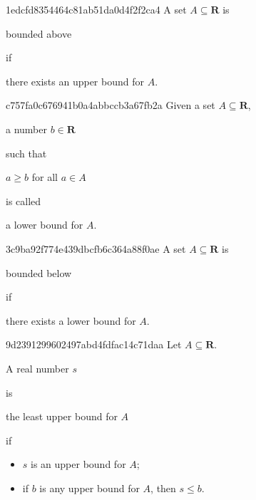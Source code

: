 \begin{note}{1edcfd8354464c81ab51da0d4f2f2ca4}
    A set \({ A \subseteq \mathbf{R} }\) is \begin{icloze}{2}bounded above\end{icloze} if \begin{icloze}{1}there exists an upper bound for \({ A }\).\end{icloze}
\end{note}

\begin{note}{c757fa0c676941b0a4abbccb3a67fb2a}
    Given a set \({ A \subseteq \mathbf{R} }\), \begin{icloze}{3}a number \({ b \in \mathbf{R} }\)\end{icloze} such that \begin{icloze}{2}\({ a \geq b }\) for all \({ a \in A }\)\end{icloze} is called \begin{icloze}{1}a lower bound for \({ A }\).\end{icloze}
\end{note}

\begin{note}{3c9ba92f774e439dbcfb6c364a88f0ae}
    A set \({ A \subseteq \mathbf{R} }\) is \begin{icloze}{2}bounded below\end{icloze} if \begin{icloze}{1}there exists a lower bound for \({ A }\).\end{icloze}
\end{note}

\begin{note}{9d2391299602497abd4fdfac14c71daa}
    Let \({ A \subseteq \mathbf{R} }\). \begin{icloze}{4}A real number \({ s }\)\end{icloze} is \begin{icloze}{3}the least upper bound for \({ A }\)\end{icloze} if
    \begin{itemize}
        \item{} \begin{icloze}{2}\({ s }\) is an upper bound for \({ A }\);\end{icloze}
        \item{} \begin{icloze}{1}if \({ b }\) is any upper bound for \({ A }\), then \({ s \leq b }\).\end{icloze}
    \end{itemize}
\end{note}

